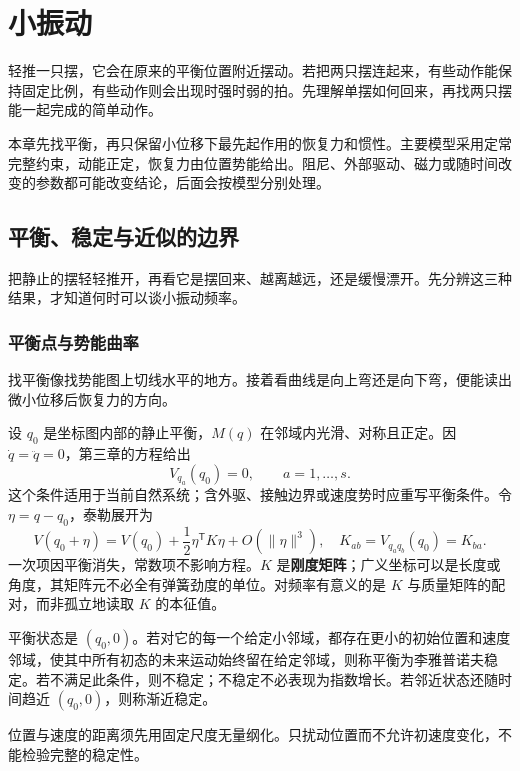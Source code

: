 \chapter{小振动}\label{ch:oscillation}

\begin{guidebox}
轻推一只摆，它会在原来的平衡位置附近摆动。若把两只摆连起来，有些动作能保持固定比例，有些动作则会出现时强时弱的拍。先理解单摆如何回来，再找两只摆能一起完成的简单动作。

本章先找平衡，再只保留小位移下最先起作用的恢复力和惯性。主要模型采用定常完整约束，动能正定，恢复力由位置势能给出。阻尼、外部驱动、磁力或随时间改变的参数都可能改变结论，后面会按模型分别处理。
\end{guidebox}

\section{平衡、稳定与近似的边界}
把静止的摆轻轻推开，再看它是摆回来、越离越远，还是缓慢漂开。先分辨这三种结果，才知道何时可以谈小振动频率。

\subsection{平衡点与势能曲率}
找平衡像找势能图上切线水平的地方。接着看曲线是向上弯还是向下弯，便能读出微小位移后恢复力的方向。

设 $q_0$ 是坐标图内部的静止平衡，$M(q)$ 在邻域内光滑、对称且正定。因 $\dot q=\ddot q=0$，第三章的方程给出
\begin{equation}
V_{q_a}(q_0)=0,\qquad a=1,\ldots,s.
\label{eq:equilibrium}
\end{equation}
这个条件适用于当前自然系统；含外驱、接触边界或速度势时应重写平衡条件。令 $\eta=q-q_0$，泰勒展开为
\begin{equation}
V(q_0+\eta)=V(q_0)+\frac12\eta^{\mathsf T}K\eta+O(\|\eta\|^3),
\quad K_{ab}=V_{q_aq_b}(q_0)=K_{ba}.
\label{eq:potential-quadratic}
\end{equation}
一次项因平衡消失，常数项不影响方程。$K$ 是\textbf{刚度矩阵}；广义坐标可以是长度或角度，其矩阵元不必全有弹簧劲度的单位。对频率有意义的是 $K$ 与质量矩阵的配对，而非孤立地读取 $K$ 的本征值。

\begin{definition}[相空间中的稳定性]
平衡状态是 $(q_0,0)$。若对它的每一个给定小邻域，都存在更小的初始位置和速度邻域，使其中所有初态的未来运动始终留在给定邻域，则称平衡为李雅普诺夫稳定。若不满足此条件，则不稳定；不稳定不必表现为指数增长。若邻近状态还随时间趋近 $(q_0,0)$，则称渐近稳定。
\end{definition}
位置与速度的距离须先用固定尺度无量纲化。只扰动位置而不允许初速度变化，不能检验完整的稳定性。

